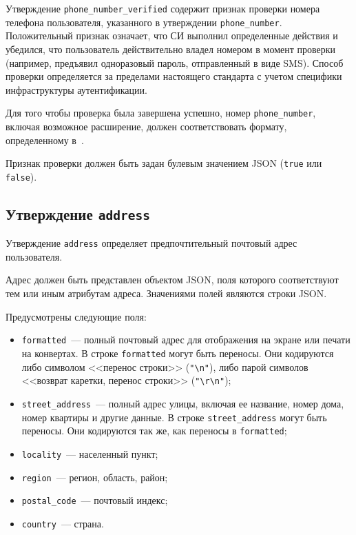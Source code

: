 Утверждение \lstinline{phone_number_verified} содержит признак проверки номера
телефона пользователя, указанного в утверждении \lstinline{phone_number}. 
%
Положительный признак означает, что СИ выполнил определенные действия и
убедился, что пользователь действительно  владел номером в момент проверки
(например, предъявил одноразовый пароль, отправленный в виде SMS).
%
Способ проверки определяется за пределами настоящего стандарта с учетом 
специфики инфраструктуры аутентификации.  

Для того чтобы проверка была завершена успешно, номер \lstinline{phone_number}, 
включая возможное расширение, должен соответствовать формату, определенному 
в~\cite{E-164,RFC3966}.  

Признак проверки должен быть задан булевым значением JSON
(\lstinline{true} или \lstinline{false}). 

\subsection{Утверждение \lstinline{address}}\label{CLAIMS.Address}

Утверждение \lstinline{address} определяет предпочтительный почтовый адрес пользователя. 

Адрес должен быть представлен объектом JSON, поля которого соответствуют тем 
или иным атрибутам адреса. Значениями полей являются строки JSON.

Предусмотрены следующие поля:
\begin{itemize}
\item
\lstinline{formatted}~---
полный почтовый адрес для отображения на экране или печати на конвертах.
%
В строке \lstinline{formatted} могут быть переносы. Они кодируются либо 
символом <<перенос строки>> (\lstinline{"\n"}), либо парой символов
<<возврат каретки, перенос строки>> (\lstinline{"\r\n"});

\item
\lstinline{street_address}~--- полный адрес улицы, включая
ее название, номер дома, номер квартиры и другие данные.
%
В строке \lstinline{street_address} могут быть переносы. Они кодируются так же,
как переносы в \lstinline{formatted};

\item
\lstinline{locality}~--- 
населенный пункт;

\item
\lstinline{region}~--- 
регион, область, район;
%

\item
\lstinline{postal_code}~--- 
почтовый индекс;

\item
\lstinline{country}~--- страна.
\end{itemize}

